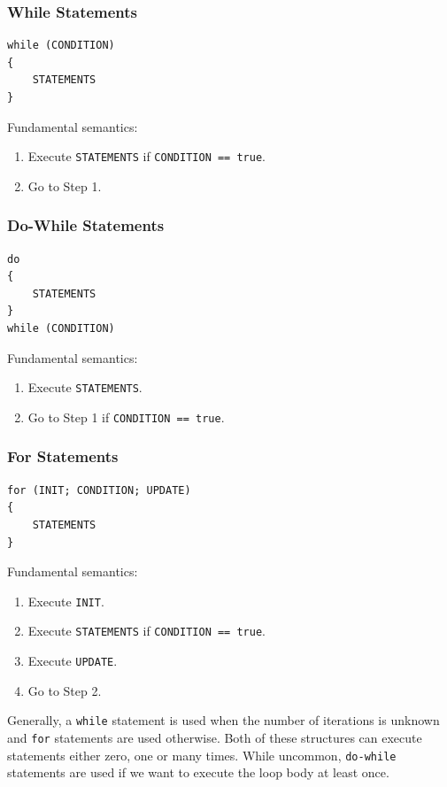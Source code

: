 \documentclass{article}
\begin{document}
\subsubsection{While Statements}
\begin{verbatim}
while (CONDITION)
{
    STATEMENTS
}
\end{verbatim}
Fundamental semantics:
\begin{enumerate}
    \item Execute \texttt{STATEMENTS} if
          \texttt{CONDITION == true}.
    \item Go to Step 1.
\end{enumerate}
\subsubsection{Do-While Statements}
\begin{verbatim}
do
{
    STATEMENTS
}
while (CONDITION)
\end{verbatim}
Fundamental semantics:
\begin{enumerate}
    \item Execute \texttt{STATEMENTS}.
    \item Go to Step 1 if \texttt{CONDITION == true}.
\end{enumerate}
\subsubsection{For Statements}
\begin{verbatim}
for (INIT; CONDITION; UPDATE)
{
    STATEMENTS
}
\end{verbatim}
Fundamental semantics:
\begin{enumerate}
    \item Execute \texttt{INIT}.
    \item Execute \texttt{STATEMENTS} if
          \texttt{CONDITION == true}.
    \item Execute \texttt{UPDATE}.
    \item Go to Step 2.
\end{enumerate}
Generally, a \texttt{while} statement is used when the number of iterations is unknown and
\texttt{for} statements are used otherwise. Both of these structures can execute
statements either zero, one or many times.
While uncommon, \texttt{do-while} statements are used if we want to
execute the loop body at least once.
\end{document}
